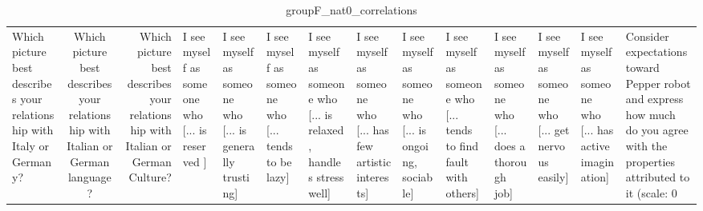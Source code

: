 \begin{table}
\caption{groupF_nat0_correlations}
\label{tab:groupF_nat0_correlations}
\begin{tabular}{lcr}
\toprule
Which picture best describes your relationship with Italy or Germany? & Which picture best describes your relationship with Italian or German language? & Which picture best describes your relationship with Italian or German Culture? & I see myself as someone who  [... is reserved ] & I see myself as someone who  [... is generally trusting] & I see myself as someone who  [... tends to be lazy] & I see myself as someone who  [... is relaxed, handles stress well] & I see myself as someone who  [... has few artistic interests] & I see myself as someone who  [... is ongoing, sociable] & I see myself as someone who  [... tends to find fault with others] & I see myself as someone who  [... does a thorough job] & I see myself as someone who  [... get nervous easily] & I see myself as someone who  [... has active imagination] & Consider expectations toward Pepper robot and express how much do you agree with the properties attributed to it (scale: 0%
\end{tabular}
\end{table}
